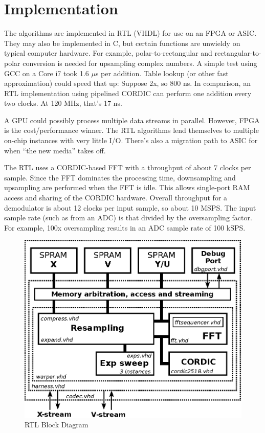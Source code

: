 \section{Implementation}

The algorithms are implemented in RTL (VHDL) for use on an FPGA or ASIC.
They may also be implemented in C, but certain functions are unwieldy on
typical computer hardware. For example, polar-to-rectangular and
rectangular-to-polar conversion is needed for upsampling complex numbers.
A simple test using GCC on a Core i7 took 1.6 $\mu$s per addition.
Table lookup (or other fast approximation) could speed that up:
Suppose 2x, so 800 ns.
In comparison, an RTL implementation using pipelined CORDIC can perform
one addition every two clocks. At 120 MHz, that's 17 ns.

A GPU could possibly process multiple data streams in parallel. 
However, FPGA is the cost/performance winner. 
The RTL algorithms lend themselves to multiple on-chip instances with very
little I/O. There's also a migration path to ASIC for when
``the new media'' takes off.

The RTL uses a CORDIC-based FFT with a throughput of about 7 clocks per sample.
Since the FFT dominates the processing time, downsampling and upsampling
are performed when the FFT is idle. This allows single-port RAM access and
sharing of the CORDIC hardware.
Overall throughput for a demodulator is about 12 clocks per input sample,
so about 10 MSPS. The input sample rate (such as from an ADC) is that divided
by the oversampling factor. For example, 100x oversampling results in
an ADC sample rate of 100 kSPS.

\begin{figure}
	\centering
	\includegraphics[width=0.8\linewidth]{../source/rtl_e}
	\caption[Emergent to Causal Time Hardware]{RTL Block Diagram}
	\label{fig:rtl}
\end{figure}

